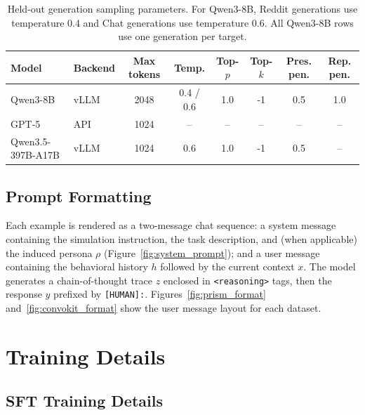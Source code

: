 \documentclass[11pt]{article}
\begin{document}
\begin{table}[t]
\centering
\small
\setlength{\tabcolsep}{6pt}
\begin{tabular*}{\textwidth}{@{\extracolsep{\fill}}llcccccc@{}}
\toprule
Model & Backend & Max tokens & Temp. & Top-$p$ & Top-$k$ & Pres. pen. & Rep. pen. \\
\midrule
Qwen3-8B & vLLM & 2048 & 0.4 / 0.6 & 1.0 & -1 & 0.5 & 1.0 \\
GPT-5 & API & 1024 & -- & -- & -- & -- & -- \\
Qwen3.5-397B-A17B & vLLM & 1024 & 0.6 & 1.0 & -1 & 0.5 & -- \\
\bottomrule
\end{tabular*}
\caption{Held-out generation sampling parameters. For Qwen3-8B, Reddit generations use temperature 0.4 and Chat generations use temperature 0.6. All Qwen3-8B rows use one generation per target.}
\label{tab:heldout_generation_params}
\end{table}

\subsection{Prompt Formatting}
Each example is rendered as a two-message chat sequence: a system message containing the simulation instruction, the task description, and (when applicable) the induced persona $\rho$ (Figure~\ref{fig:system_prompt}); and a user message containing the behavioral history $h$ followed by the current context $x$. The model generates a chain-of-thought trace $z$ enclosed in \texttt{<reasoning>} tags, then the response $y$ prefixed by \texttt{[HUMAN]:}. Figures~\ref{fig:prism_format} and~\ref{fig:convokit_format} show the user message layout for each dataset.



\section{Training Details}
\label{app:training_details}
\subsection{SFT Training Details}
\label{app:sft_training_details}
\label{app:thinking-trace-prompt}
\label{app:hyperparams}
\end{document}
